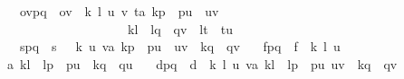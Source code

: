 \documentclass{llncs}
\begin{document}
\begin{isabellebody}
\ \ ov{\isacharcolon}{\isachardoublequoteopen}{\isacharparenleft}p{\isacharcomma}q{\isacharparenright}\ {\isasymin}\ ov\ {\isacharequal}\ {\isacharparenleft}{\isasymexists}k\ l\ u\ v\ t{\isacharcolon}{\isacharcolon}{\isacharprime}a{\isachardot}\ {\isacharparenleft}k{\isasymparallel}p\ {\isasymand}\ p{\isasymparallel}u\ {\isasymand}\ u{\isasymparallel}v{\isacharparenright}\ {\isasymand}\   \isanewline
\ \ \ \ \ \ \ \ \ \ \ \ \ \ \ \ \ \ \ {\isacharparenleft}k{\isasymparallel}l\ {\isasymand}\ l{\isasymparallel}q\ {\isasymand}\ q{\isasymparallel}v{\isacharparenright}\ {\isasymand}\ {\isacharparenleft}l{\isasymparallel}t\ {\isasymand}\ t{\isasymparallel}u{\isacharparenright}{\isacharparenright}{\isachardoublequoteclose}\ \isanewline
\ \ s{\isacharcolon}{\isachardoublequoteopen}{\isacharparenleft}p{\isacharcomma}q{\isacharparenright}\ {\isasymin}\ s\ {\isacharequal}\ \ {\isacharparenleft}{\isasymexists}k\ u\ v{\isacharcolon}{\isacharcolon}{\isacharprime}a{\isachardot}\ k{\isasymparallel}p\ {\isasymand}\ p{\isasymparallel}u\ {\isasymand}\ u{\isasymparallel}v\ {\isasymand}\ k{\isasymparallel}q\ {\isasymand}\ q{\isasymparallel}v{\isacharparenright}{\isachardoublequoteclose}\ \isanewline
\ \ f{\isacharcolon}{\isachardoublequoteopen}{\isacharparenleft}p{\isacharcomma}q{\isacharparenright}\ {\isasymin}\ f\ {\isacharequal}\ {\isacharparenleft}{\isasymexists}k\ l\  u {\isacharcolon}{\isacharcolon}{\isacharprime}a{\isachardot}\ k{\isasymparallel}l\ {\isasymand}\ l{\isasymparallel}p\ {\isasymand}\ p{\isasymparallel}u\ {\isasymand}\ k{\isasymparallel}q\ {\isasymand}\ q{\isasymparallel}u{\isacharparenright}{\isachardoublequoteclose}\ \isanewline
\ \ d{\isacharcolon}{\isachardoublequoteopen}{\isacharparenleft}p{\isacharcomma}q{\isacharparenright}\ {\isasymin}\ d\ {\isacharequal}\ {\isacharparenleft}{\isasymexists}k\ l\ u\ v{\isacharcolon}{\isacharcolon}{\isacharprime}a{\isachardot}\ k{\isasymparallel}l\ {\isasymand}\ l{\isasymparallel}p\ {\isasymand}\ p{\isasymparallel}u\ {\isasymand}u{\isasymparallel}v\ {\isasymand}\ k{\isasymparallel}q\ {\isasymand}\ q{\isasymparallel}v{\isacharparenright}{\isachardoublequoteclose}\isanewline %

\end{isabellebody}
\end{document}
